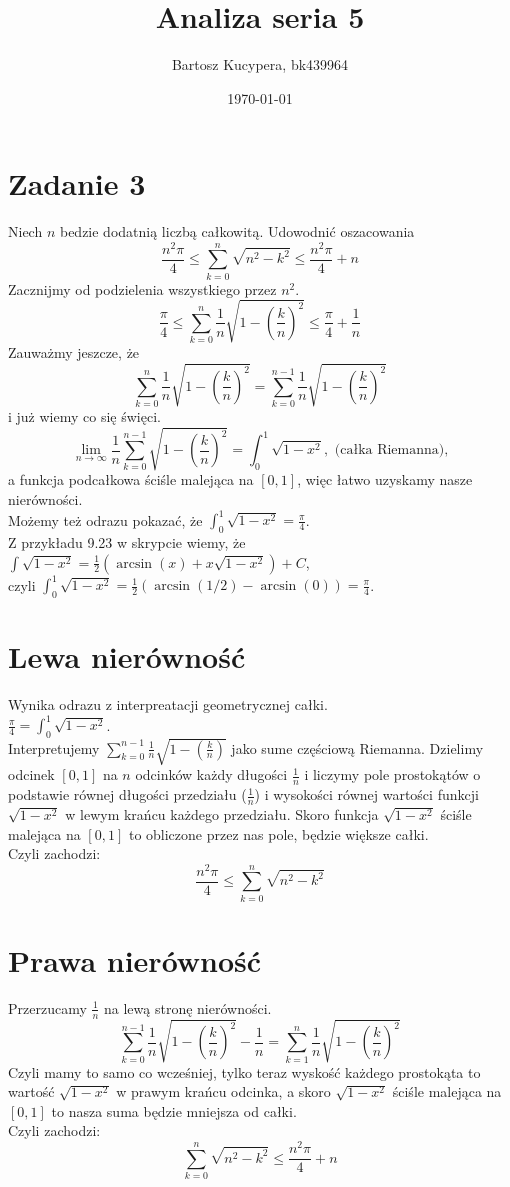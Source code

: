 \documentclass{article}
\title{Analiza seria 5}
\author{Bartosz Kucypera, bk439964}
\date{\today}
\begin{document}
\maketitle

\section*{Zadanie 3}
Niech $n$ bedzie dodatnią liczbą całkowitą. Udowodnić oszacowania 
$$\frac{n^2\pi}{4} \le \sum_{k=0}^n\sqrt{n^2-k^2} \le \frac{n^2\pi}{4} + n$$
Zacznijmy od podzielenia wszystkiego przez $n^2$.
$$\frac{\pi}{4} \le \sum_{k=0}^{n}\frac{1}{n}\sqrt{1-\left(\frac{k}{n}\right)^2} \le \frac{\pi}{4} + \frac{1}{n}$$
Zauważmy jeszcze, że $$\sum_{k=0}^{n}\frac{1}{n}\sqrt{1-\left(\frac{k}{n}\right)^2} = 
\sum_{k=0}^{n-1}\frac{1}{n}\sqrt{1-\left(\frac{k}{n}\right)^2}$$ i już wiemy co się święci.
$$\lim_{n\to \infty}\frac{1}{n}\sum_{k=0}^{n-1}\sqrt{1-\left(\frac{k}{n}\right)^2} = \int_0^1\sqrt{1-x^2}, \mbox{ (całka Riemanna),}$$ 
a funkcja podcałkowa ściśle malejąca na $[0, 1]$, więc łatwo uzyskamy nasze nierówności. \\
Możemy też odrazu pokazać, że $\int_0^1\sqrt{1-x^2} = \frac{\pi}{4}$. \\
Z przykładu 9.23 w skrypcie wiemy, że $\int\sqrt{1-x^2} = \frac{1}{2}(\arcsin(x) + x\sqrt{1-x^2}) +C$, \\
czyli $\int_0^1\sqrt{1-x^2} = \frac{1}{2}(\arcsin(1/2) - \arcsin(0)) = \frac{\pi}{4}$. \\

\section*{Lewa nierówność}
Wynika odrazu z interpreatacji geometrycznej całki. \\
$\displaystyle \frac{\pi}{4} = \int_0^1\sqrt{1-x^2}$. \\
Interpretujemy $\displaystyle \sum_{k=0}^{n-1}\frac{1}{n}\sqrt{1-\left(\frac{k}{n}\right)}$ jako sume częściową Riemanna.
Dzielimy odcinek $[0, 1]$ na $n$ odcinków każdy długości $\frac{1}{n}$ i liczymy pole 
prostokątów o podstawie równej długości przedziału ($\frac{1}{n}$) i wysokości równej wartości funkcji $\sqrt{1-x^2}$ w lewym krańcu każdego przedziału. Skoro funkcja $\sqrt{1-x^2}$ ściśle malejąca na $[0, 1]$
to obliczone przez nas pole, będzie większe całki. \\
Czyli zachodzi:
$$ \frac{n^2 \pi}{4} \le \sum_{k=0}^{n}\sqrt{n^2-k^2}$$
\section*{Prawa nierówność}
Przerzucamy $\frac{1}{n}$ na lewą stronę nierówności. \\
$$\sum_{k=0}^{n-1}\frac{1}{n}\sqrt{1-\left(\frac{k}{n}\right)^2}-\frac{1}{n} = \sum_{k=1}^{n}\frac{1}{n}\sqrt{1-\left(\frac{k}{n}\right)^2}$$
Czyli mamy to samo co wcześniej, tylko teraz wyskość każdego prostokąta to wartość $\sqrt{1-x^2}$ w prawym krańcu odcinka, a skoro $\sqrt{1-x^2}$ ściśle malejąca na $[0, 1]$ to nasza suma będzie mniejsza od całki.\\
Czyli zachodzi:
$$ \sum_{k=0}^{n}\sqrt{n^2-k^2} \le \frac{n^2 \pi}{4} + n$$
\end{document}
